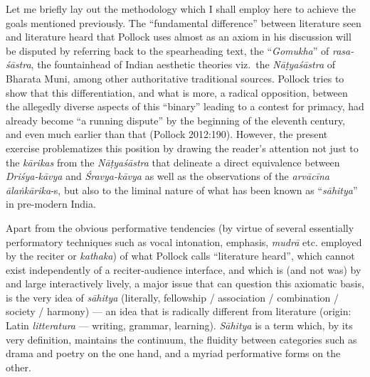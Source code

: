 Let me briefly lay out the methodology which I shall employ here to achieve the goals mentioned previously. The “fundamental difference” between literature seen and literature heard that Pollock uses almost as an axiom in his discussion will be disputed by referring back to the spearheading text, the “\textsl{Gomukha}” of \textsl{rasa-śāstra}, the fountainhead of Indian aesthetic theories viz.~the \textsl{Nāṭyaśāstra} of Bharata Muni, among other authoritative traditional sources. Pollock tries to show that this differentiation, and what is more, a radical opposition, between the allegedly diverse aspects of this “binary” leading to a contest for primacy, had already become “a running dispute” by the beginning of the eleventh century, and even much earlier than that (Pollock 2012:190). However, the present exercise problematizes this position by drawing the reader’s attention not just to the \textsl{kārikas} from the \textsl{Nāṭyaśāstra} that delineate a direct equivalence between \textsl{Driśya-kāvya} and \textsl{Śravya-kāvya} as well as the observations of the \textsl{arvācīna ālaṅkārika}-s, but also to the liminal nature of what has been known as “\textsl{sāhitya}” in pre-modern India.

Apart from the obvious performative tendencies (by virtue of several essentially performatory techniques such as vocal intonation, emphasis, \textsl{mudrā} etc. employed by the reciter or \textsl{kathaka}) of what Pollock calls “literature heard”, which cannot exist independently of a reciter-audience interface, and which is (and not was) by and large interactively lively, a major issue that can question this axiomatic basis, is the very idea of \textsl{sāhitya} (literally, fellowship / association / combination / society / harmony) --- an idea that is radically different from literature (origin: Latin \textsl{litteratura} --- writing, grammar, learning). \textsl{Sāhitya} is a term which, by its very definition, maintains the continuum, the fluidity between categories such as drama and poetry on the one hand, and a myriad performative forms on the other. 

